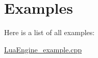 \section{Examples}
Here is a list of all examples\-:\begin{DoxyCompactItemize}
\item 
\hyperlink{_lua_engine_example_8cpp-example}{Lua\-Engine\-\_\-example.\-cpp}
\end{DoxyCompactItemize}
